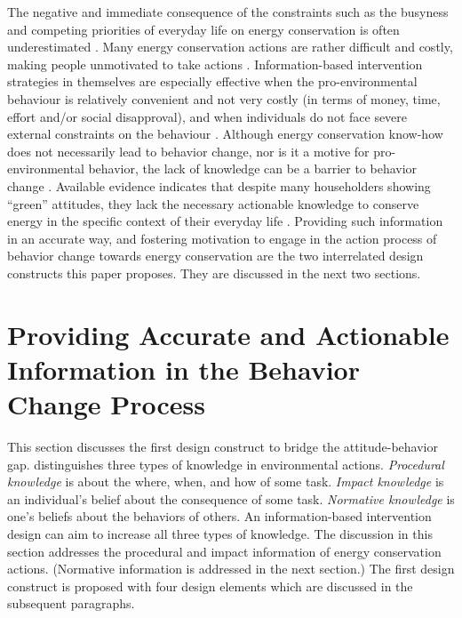 \documentclass[a4paper]{article}
\begin{document}
The negative and immediate consequence of the constraints such as the busyness and competing priorities of everyday life on energy conservation is often underestimated \citep{Berthou2013,Burchell2014,Dillahunt2014,Strengers2014}. Many energy conservation actions are rather difficult and costly, making people unmotivated to take actions \citep{Fogg2009,ockwell2009reorienting,Petkov2011,corradi2013oops}. Information-based intervention strategies in themselves are especially effective when the pro-environmental behaviour is relatively convenient and not very costly (in terms of money, time, effort and/or social disapproval), and when individuals do not face severe external constraints on the behaviour \citep{Steg2009}.  Although energy conservation know-how does not necessarily lead to behavior change, nor is it a motive for pro-environmental behavior, the lack of knowledge can be a barrier to behavior change \citep{Schultz2002}. Available evidence 
indicates that despite many householders showing ``green'' attitudes, they lack the necessary actionable knowledge to conserve energy in the specific context of their everyday life \citep{Gardner2008}. Providing such information in an accurate way, and fostering motivation to engage in the action process of behavior change towards energy conservation are the two interrelated design constructs this paper proposes. They are discussed in the next two sections. 

\section{Providing Accurate and Actionable Information in the Behavior Change Process}
\label{sec:information}

This section discusses the first design construct to bridge the attitude-behavior gap. \citet{Schultz2002} distinguishes three types of knowledge in environmental actions. \textit{Procedural knowledge} is about the where, when, and how of some task. \textit{Impact knowledge} is an individual's belief about the consequence of some task. \textit{Normative knowledge} is one's beliefs about the behaviors of others. An information-based intervention design can aim to increase %
all three types of knowledge. The discussion in this section addresses the procedural and impact information of energy conservation actions. (Normative information is addressed in the next section.) The first design construct is proposed with four design elements which are discussed in the subsequent paragraphs. 
\end{document}
